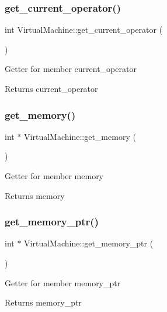 \subsubsection{\texorpdfstring{get\+\_\+current\+\_\+operator()}{get\_current\_operator()}}
{\footnotesize\ttfamily int Virtual\+Machine\+::get\+\_\+current\+\_\+operator (\begin{DoxyParamCaption}{ }\end{DoxyParamCaption})}

Getter for member current\+\_\+operator \begin{DoxyReturn}{Returns}
current\+\_\+operator 
\end{DoxyReturn}
\mbox{\label{classVirtualMachine_ab66b22be50763f52d2ff5666251df4d7}} 
\subsubsection{\texorpdfstring{get\+\_\+memory()}{get\_memory()}}
{\footnotesize\ttfamily int $\ast$ Virtual\+Machine\+::get\+\_\+memory (\begin{DoxyParamCaption}{ }\end{DoxyParamCaption})}

Getter for member memory \begin{DoxyReturn}{Returns}
memory 
\end{DoxyReturn}
\mbox{\label{classVirtualMachine_a4a3c3c348eff0f3384ba96ad770886df}} 
\subsubsection{\texorpdfstring{get\+\_\+memory\+\_\+ptr()}{get\_memory\_ptr()}}
{\footnotesize\ttfamily int $\ast$ Virtual\+Machine\+::get\+\_\+memory\+\_\+ptr (\begin{DoxyParamCaption}{ }\end{DoxyParamCaption})}

Getter for member memory\+\_\+ptr \begin{DoxyReturn}{Returns}
memory\+\_\+ptr 
\end{DoxyReturn}
\mbox{\label{classVirtualMachine_ace7438bc3a4fa6c0acedb8636a5354ab}} 
